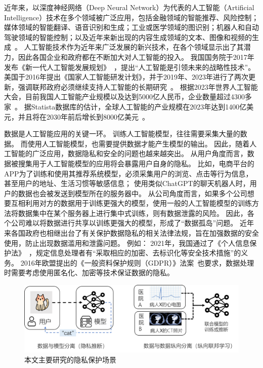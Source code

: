 近年来，以深度神经网络（Deep Neural Network）为代表的人工智能（Artificial Intelligence）技术在多个领域被广泛应用，包括金融领域的智能推荐、风险控制；媒体领域的智能翻译、语音识别和生成；工业或医学领域的图识别；机器人和自动驾驶领域的智能控制；以及近年来新出现的内容生成领域的文本、图像和视频的生成~\cite{lecun2015deep_learning,zhang2021ai_survey,wang2023chatgpt_survey}。
%
人工智能技术作为近年来广泛发展的新兴技术，在各个领域显示出了其潜力，因此各国企业和政府都在不断加大对人工智能的投入。
%
我国国务院于2017年发布《新一代人工智能发展规划》~\cite{china2017ai_plan}，提出“人工智能是引领未来的战略性技术”。
%
美国于2016年提出《国家人工智能研发计划》，并于2019年、2023年进行了两次更新，强调联邦政府必须继续支持人工智能的长期研究~\cite{usa2023ai_plan}。
%
根据2023年世界人工智能大会，目前我国人工智能产业规模以及达到5000亿人民币，企业数量超过4300多家~\cite{2023china_ai_conf}。
%
据Statista数据库的估计，全球人工智能的产业规模在2023年达到1400亿美元，并且将在2030年前后增长到8000亿美元~。

%
数据是人工智能应用的关键一环。
%
训练人工智能模型，往往需要采集大量的数据。
而使用人工智能模型，也需要提供数据才能产生模型的输出。
%
因此，随着人工智能的广泛应用，数据隐私和安全的问题也越来越突出。
%
从用户角度而言，数据被搜集用于人工智能模型的应用将会暴露用户自身的隐私。
%
比如，电商平台的APP为了训练和使用其推荐系统模型，必须采集用户的浏览、点击等行为信息，甚至用户的地址、生活习惯等敏感信息；
使用类似ChatGPT的聊天机器人时，用户的数据也会被发送到模型所在的服务器中。
%
从公司角度而言，如果多个公司想要互相利用对方的数据用于训练更强大的模型，使用一般的人工智能模型的训练方法将数据集中在某个服务器上进行集中式训练，则有数据泄露的风险。
因此，各个公司难以将数据进行共享以训练更强大的模型，形成了“数据孤岛”问题。
%
近年来各国政府也相继出台了有关保护数据隐私的相关法律法规，旨在加强数据的安全使用，防止出现数据滥用和泄露问题。
%
例如：
2021年，我国通过了《个人信息保护法》~\cite{china_personal_information_protection}，规定信息处理者有“采取相应的加密、去标识化等安全技术措施”的义务。
2016年欧盟提出的《一般资料保护规则（GDPR）》法案~\cite{GDPR}也要求，数据处理时需要考虑使用匿名化、加密等技术保证数据的隐私。


\begin{figure}[h]
    \centering
    \includegraphics[width=1\linewidth]{Z_Resources/PPML-overview.png}
    \caption{本文主要研究的隐私保护场景}
    \label{fig:intro:ppml-overview}
\end{figure}


